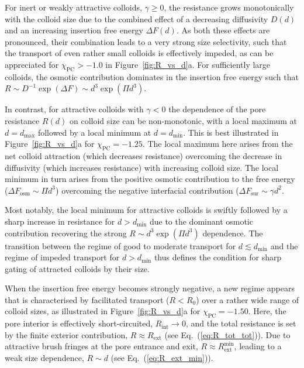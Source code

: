 \documentclass[12pt, a4paper]{article}
\begin{document}
For inert or weakly attractive colloids, $\gamma \geq 0$, the resistance grows monotonically with the colloid size due to the combined effect of a decreasing diffusivity $D(d)$ and an increasing insertion free energy  $\Delta F(d)$.
As both these effects are pronounced, their combination leads to a very strong size selectivity, such that the transport of even rather small colloids is effectively impeded, as can be appreciated for $\chi_{\text{PC}} > -1.0$ in Figure~\ref{fig:R_vs_d}a.
For sufficiently large colloids, the osmotic contribution dominates in the insertion free energy such that $R \sim D^{-1} \exp (\Delta F) \sim d^3 \exp (\Pi d^3)$.

In contrast, for attractive colloids with $\gamma <0$ the dependence of the pore resistance $R(d)$ on colloid size can be non-monotonic, with a local maximum at $d=d_{\text{max}}$ followed by a local minimum at $d=d_{\text{min}}$.
This is best illustrated in Figure~\ref{fig:R_vs_d}a for $\chi_{\text{PC}} = -1.25$.
The local maximum here arises from the net colloid attraction (which decreases resistance) overcoming the decrease in diffusivity (which increases resistance) with increasing colloid size.
The local minimum in turn arises from the positive osmotic contribution to the free energy ($\Delta F_{\text{osm}} \sim \Pi d^3$) overcoming the negative interfacial contribution ($\Delta F_{\text{sur}} \sim \gamma d^2$.

Most notably, the local minimum for attractive colloids is swiftly followed by a sharp increase in resistance for $d > d_{\text{min}}$ due to the dominant osmotic contribution recovering the strong $R \sim d^3 \exp(\Pi d^3)$ dependence.
The transition between the regime of good to moderate transport for $d \lesssim d_{\text{min}}$ and the regime of impeded transport for $d > d_{\text{min}}$ thus defines the condition for sharp gating of attracted colloids by their size.

When the insertion free energy becomes strongly negative, a new regime appears that is characterised by facilitated transport ($R < R_0$) over a rather wide range of colloid sizes, as illustrated in Figure~\ref{fig:R_vs_d}a for $\chi_{\text{PC}} = -1.50$.
Here, the pore interior is effectively short-circuited, $R_{\text{int}} \to 0$, and the total resistance is set by the finite exterior contribution, $R \approx R_{\text{ext}}$ (see Eq.~(\ref{eq:R_tot_tot})).
Due to attractive brush fringes at the pore entrance and exit, $R \approx R_{\text{ext}}^{\text{min}}$, leading to a weak size dependence, $R \sim d$ (see Eq.~(\ref{eq:R_ext_min})).
\end{document}
